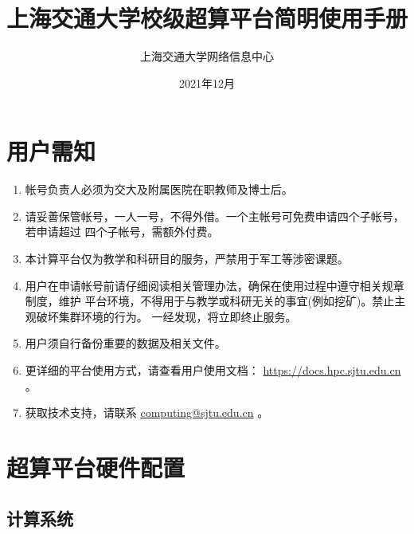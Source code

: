 \documentclass[cn, 12pt, hang, black, chinese]{elegantbook}
\title{上海交通大学校级超算平台简明使用手册}
\author{上海交通大学网络信息中心}
\institute{计算业务部}
\date{2021年12月}
\begin{document}
\maketitle
\frontmatter

\chapter*{用户需知}


\begin{enumerate}
\item 帐号负责人必须为交大及附属医院在职教师及博士后。
\item 请妥善保管帐号，一人一号，不得外借。一个主帐号可免费申请四个子帐号，若申请超过 四个子帐号，需额外付费。
\item 本计算平台仅为教学和科研目的服务，严禁用于军工等涉密课题。
\item 用户在申请帐号前请仔细阅读相关管理办法，确保在使用过程中遵守相关规章制度，维护 平台环境，不得用于与教学或科研无关的事宜(例如挖矿)。禁止主观破坏集群环境的行为。 一经发现，将立即终止服务。
\item 用户须自行备份重要的数据及相关文件。
\item 更详细的平台使用方式，请查看用户使用文档： \href{https://docs.hpc.sjtu.edu.cn}{https://docs.hpc.sjtu.edu.cn} 。
\item 获取技术支持，请联系 \href{mailto:computing@sjtu.edu.cn}{computing@sjtu.edu.cn} 。
\end{enumerate}

\tableofcontents

\mainmatter

\chapter{超算平台硬件配置}

\section{计算系统}
\end{document}
